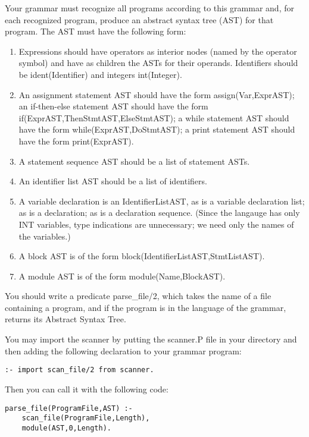 \begin{enumerate}
Your grammar must recognize all programs according to this grammar
and, for each recognized program, produce an abstract syntax tree
(AST) for that program.  The AST must have the following form:

\begin{enumerate}

\item Expressions should have operators as interior nodes (named by the
operator symbol) and have as children the ASTs for their operands.
Identifiers should be ident(Identifier) and integers int(Integer).

\item An assignment statement AST should have the form
assign(Var,ExprAST); an if-then-else statement AST should have the
form if(ExprAST,ThenStmtAST,ElseStmtAST); a while statement AST should
have the form while(ExprAST,DoStmtAST); a print statement AST should
have the form print(ExprAST).

\item A statement sequence AST should be a list of statement ASTs.

\item An identifier list AST should be a list of identifiers.

\item A variable declaration is an IdentifierListAST, as is a variable
declaration list; as is a declaration; as is a declaration sequence.
(Since the langauge has only INT variables, type indications are
unnecessary; we need only the names of the variables.)

\item A block AST is of the form block(IdentifierListAST,StmtListAST).

\item A module AST is of the form module(Name,BlockAST).
\end{enumerate}
You should write a predicate parse\_file/2, which takes the name of a
file containing a program, and if the program is in the language of
the grammar, returns its Abstract Syntax Tree.

You may import the scanner by putting the scanner.P file in your
directory and then adding the following declaration to your grammar
program:
\begin{verbatim}
:- import scan_file/2 from scanner.
\end{verbatim}

Then you can call it with the following code:

\begin{verbatim}
parse_file(ProgramFile,AST) :-
    scan_file(ProgramFile,Length),
    module(AST,0,Length).
\end{verbatim}

\end{enumerate}
